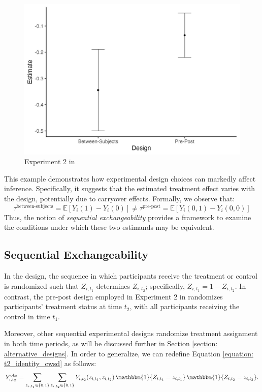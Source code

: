 \begin{figure}[h]
    \centering
    \includegraphics[width=0.75\linewidth]{Figures/estimates.jpg}
    \caption{Experiment 2 in \cite{09_Clifford}}
    \label{fig:difference-in-estimates_clifford}
\end{figure}

This example demonstrates how experimental design choices can markedly affect inference. Specifically, it suggests that the estimated treatment effect varies with the design, potentially due to carryover effects. Formally, we observe that:
\[
 \tau^{\text{between-subjects}} = \mathbb{E}[Y_i(1) - Y_i(0)] \neq \tau^{\text{pre-post}} = \mathbb{E}[Y_i(0,1) - Y_i(0,0)]
\]
Thus, the notion of \emph{sequential exchangeability} provides a framework to examine the conditions under which these two estimands may be equivalent.

\subsection{Sequential Exchangeability}

In the \cwsd{} design, the sequence in which participants receive the treatment or control is randomized such that $Z_{i,t_1}$ determines $Z_{i,t_2}$; specifically, $Z_{i,t_1} = 1 - Z_{i,t_2}$. In contrast, the pre-post design employed in Experiment 2 in \cite{09_Clifford} randomizes participants' treatment status at time $t_2$, with all participants receiving the control in time $t_1$.

Moreover, other sequential experimental designs randomize treatment assignment in both time periods, as will be discussed further in Section \ref{section: alternative_designs}. In order to generalize, we can redefine Equation \ref{equation: t2_identity_cwsd} as follows:
\begin{equation}
\label{equation: t2_identity} 
    Y_{i,t_2}^{\text{obs}} = \sum_{z_{i,t_1} \in \{0,1\}} \sum_{z_{i,t_2} \in \{0,1\}} Y_{i,t_2}(z_{i,t_1}, z_{i,t_2})\,\mathbbm{1}\{Z_{i,t_1} = z_{i,t_1}\}\,\mathbbm{1}\{Z_{i,t_2} = z_{i,t_2}\}.
\end{equation}

